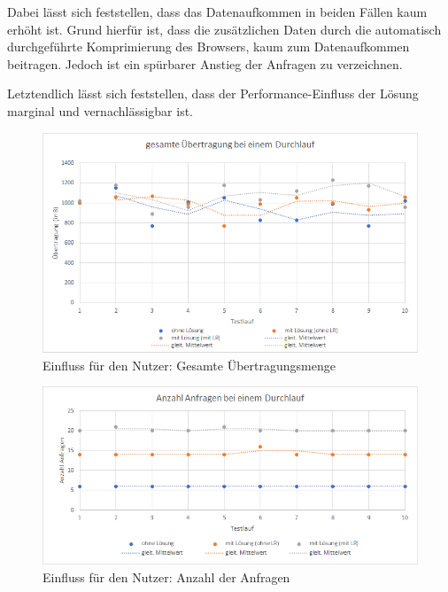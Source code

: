 Dabei lässt sich feststellen, dass das Datenaufkommen in beiden Fällen kaum erhöht ist. Grund hierfür ist, dass die zusätzlichen Daten durch die automatisch durchgeführte Komprimierung\footnotemark{} des Browsers, kaum zum Datenaufkommen beitragen. Jedoch ist ein spürbarer Anstieg der Anfragen zu verzeichnen.

Letztendlich lässt sich feststellen, dass der Performance-Einfluss der Lösung marginal und vernachlässigbar ist.


\begin{figure}[H]
	\centering
	\includegraphics[width=1.00\linewidth]{data/Einfluss-fuer-den-Nutzer/Einfluss-fuer-den-Nutzer_gesamte-Uebertragung.png}
	\caption{Einfluss für den Nutzer: Gesamte Übertragungsmenge}
	\label{fig:Einfluss-fuer-den-Nutzer_gesamte-Uebertragung}
\end{figure}

\begin{figure}[H]
	\centering
	\includegraphics[width=1.00\linewidth]{data/Einfluss-fuer-den-Nutzer/Einfluss-fuer-den-Nutzer_Anzahl-Anfragen.png}
	\caption{Einfluss für den Nutzer: Anzahl der Anfragen}
	\label{fig:Einfluss-fuer-den-Nutzer_Anzahl-Anfragen}
\end{figure}
